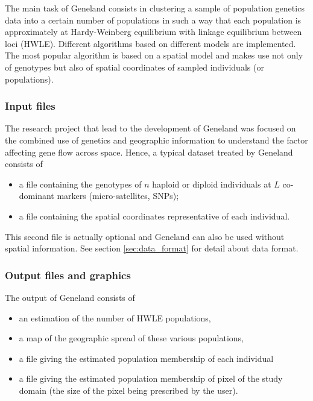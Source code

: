 \documentclass[a4paper,10pt]{article}
\begin{document}
The main task of {\sc Geneland} consists in clustering a sample of population  genetics data 
into a certain number of populations in such a way that each population is approximately at Hardy-Weinberg equilibrium with 
linkage equilibrium between loci (HWLE). 
Different algorithms based on different models are implemented. The most popular algorithm is based on a spatial model 
and makes use not only of genotypes but also of spatial coordinates of sampled individuals (or populations). 

\subsubsection{Input files}



The research project that lead to the development of {\sc Geneland} was  focused on the combined use of genetics and geographic 
information to understand the factor affecting gene flow across space.
Hence, a typical dataset treated by {\sc Geneland} consists of 
\begin{itemize}
\item a file containing the genotypes of 
$n$ haploid or diploid  individuals at $L$ co-dominant  markers (micro-satellites, SNPs);
\item a file containing the spatial coordinates representative of each individual.
\end{itemize}
This second file is actually optional and {\sc Geneland} can also be used without spatial information.
See section \ref{sec:data_format} for detail about data format.



\subsubsection{Output files and graphics}

The output of {\sc Geneland} consists of 
\begin{itemize}
\item an estimation of the number of HWLE populations, 
\item a map of the geographic spread of these various populations, 
\item a file giving  the estimated population membership of each individual
\item a file giving  the estimated population membership of pixel of the study domain (the size of the pixel 
being prescribed by the user).
\end{itemize}
\end{document}
